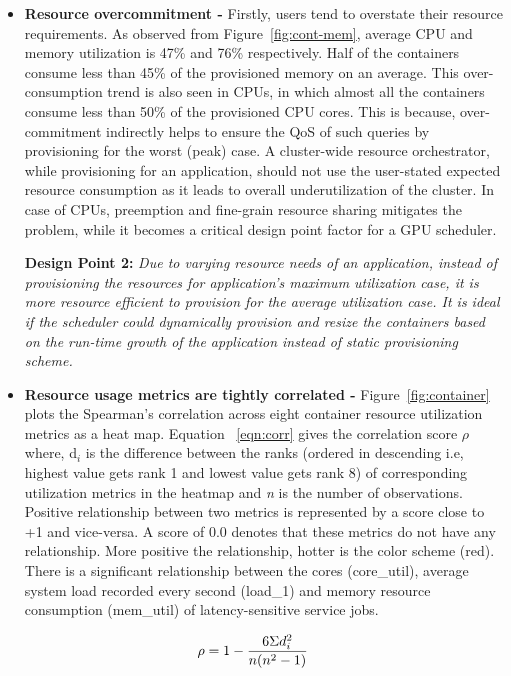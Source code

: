 \begin{itemize}[wide, nosep, labelindent = 0pt, topsep = 0.3ex]
\item \textbf{Resource overcommitment - } Firstly, users tend to overstate their resource requirements. As observed from Figure~\ref{fig:cont-mem}, average CPU and memory utilization is 47\% and 76\% respectively. Half of the containers consume less than 45\% of the provisioned memory on an average. This over-consumption trend is also seen in CPUs, in which almost all the containers consume less than 50\% of the provisioned CPU cores. This is because, over-commitment indirectly helps to ensure the QoS of such queries by provisioning for the worst (peak) case. A cluster-wide resource orchestrator, while provisioning for an application, should not use the user-stated expected resource consumption as it leads to overall underutilization of the cluster. In case of CPUs, preemption and fine-grain resource sharing mitigates the problem, while it becomes a critical design point factor for a GPU scheduler. 

\textbf{Design Point 2:}\textit{ Due to varying resource needs of an application, instead of provisioning the resources for application's maximum utilization case, it is more resource efficient to provision for the average utilization case. It is ideal if the scheduler could dynamically provision and resize the containers based on the run-time growth of the application instead of static provisioning scheme.}\\

\item \textbf{Resource usage metrics are tightly correlated -}
Figure~\ref{fig:container} plots the Spearman's correlation across eight container resource utilization metrics as a heat map. Equation ~\ref{eqn:corr} gives the correlation score $\rho$ where, d$_{i}$ is the difference between the ranks (ordered in descending i.e, highest value gets rank 1 and lowest value gets rank 8) of corresponding utilization metrics in the heatmap and \textit{n} is the number of observations. Positive relationship between two metrics is represented by a score close to +1 and vice-versa. A score of 0.0 denotes that these metrics do not have any relationship. More positive the relationship, hotter is the color scheme (red). There is a significant relationship between the cores (core\_util), average system load recorded every second (load\_1) and memory resource consumption (mem\_util) of latency-sensitive service jobs. 
\end{itemize}
 \vspace{-1mm}
\begin{equation} 
\rho = 1-{}\frac{6 \Sigma d^{2}_i}{n(n^{2}-1)}
\label{eqn:corr}
\vspace{-1mm}
\end{equation}

